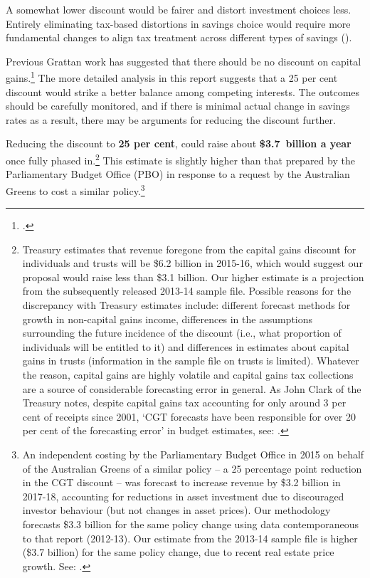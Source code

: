 A somewhat lower discount would be fairer and distort investment choices less. 
Entirely eliminating tax-based distortions in savings choice would require more fundamental changes to align tax treatment across different types of savings (). 

Previous Grattan work has suggested that there should be no discount on capital gains.\footcite[][40--43]{DaleyMcGannonSavageEtAl2013BalancingBudgets}  
The more detailed analysis in this report suggests that a 25 per cent discount would strike a better balance among competing interests. The outcomes should be carefully monitored, and if there is minimal actual change in savings rates as a result, there may be arguments for reducing the discount further.

Reducing the discount to \textbf{25 per cent}, could raise about \textbf{\$3.7~billion a year} once fully phased in.\footnote{Treasury estimates that revenue foregone from the capital gains discount for individuals and trusts will be \$6.2 billion in 2015-16, which would suggest our proposal would raise less than \$3.1 billion. Our higher estimate is a projection from the subsequently released 2013-14 sample file. Possible reasons for the discrepancy with Treasury estimates include: different forecast methods for growth in non-capital gains income, differences in the assumptions surrounding the future incidence of the discount (i.e., what proportion of individuals will be entitled to it) and differences in estimates about capital gains in trusts (information in the sample file on trusts is limited). Whatever the reason, capital gains are highly volatile and capital gains tax collections are a source of considerable forecasting error in general. As John Clark of the Treasury notes, despite capital gains tax accounting for only around 3 per cent of receipts since 2001, ‘CGT forecasts have been responsible for over 20 per cent of the forecasting error’ in budget estimates, see: \textcite{Clark2014}.}  This estimate is slightly higher than that prepared by the Parliamentary Budget Office (PBO) in response to a request by the Australian Greens to cost a similar policy.\footnote{An independent costing by the Parliamentary Budget Office in 2015 on behalf of the Australian Greens of a similar policy – a 25 percentage point reduction in the CGT discount – was forecast to increase revenue by \$3.2 billion in 2017-18, accounting for reductions in asset investment due to discouraged investor behaviour (but not changes in asset prices). Our methodology forecasts \$3.3 billion for the same policy change using data contemporaneous to that report (2012-13). Our estimate from the 2013-14 sample file is higher (\$3.7 billion) for the same policy change, due to recent real estate price growth. See: \textcite{PBO2015GreensReformingNGandCGT}.}  

